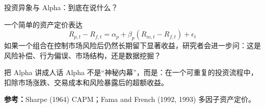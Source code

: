 \documentclass[UTF8,aspectratio=169,11pt]{ctexbeamer}
\newcommand{\source}[1]{\vfill{\scriptsize\color{aqgray}\textbf{参考：}#1}}
\begin{document}
\begin{frame}{投资异象与 Alpha：到底在说什么？}
\begin{keybox}{一个简单的资产定价表达}
\[
R_{p,t}-R_{f,t}=\alpha_p+\beta_p\left(R_{m,t}-R_{f,t}\right)+\epsilon_t
\]
\small
如果一个组合在控制市场风险后仍然长期留下显著收益，研究者会进一步问：这是风险补偿、行为偏误、市场结构，还是数据挖掘？
\end{keybox}
\vspace{0.2cm}
\begin{casebox}{把 Alpha 讲成人话}
\small
Alpha 不是“神秘内幕”，而是：在一个可重复的投资流程中，扣除市场涨跌、交易成本和风险暴露后的超额收益。
\end{casebox}
\source{Sharpe (1964) CAPM；Fama and French (1992, 1993) 多因子资产定价。}
\end{frame}

\end{document}

